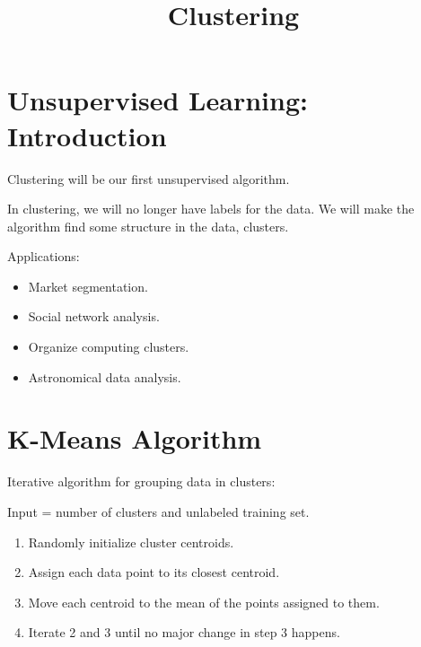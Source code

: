 \documentclass[10pt]{extarticle}
\begin{document}
 



\title{Clustering}

    
    \date{}
    

    

    \maketitle

\newpage





\section{Unsupervised Learning:
Introduction}\label{unsupervised-learning-introduction}

Clustering will be our first unsupervised algorithm.

In clustering, we will no longer have labels for the data. We will make
the algorithm find some structure in the data, clusters.

Applications:

\begin{itemize}
\itemsep1pt\parskip0pt
\item
  Market segmentation.
\item
  Social network analysis.
\item
  Organize computing clusters.
\item
  Astronomical data analysis.
\end{itemize}

\section{K-Means Algorithm}\label{k-means-algorithm}

Iterative algorithm for grouping data in clusters:

Input = number of clusters and unlabeled training set.

\begin{enumerate}
\def\labelenumi{\arabic{enumi}.}
\itemsep1pt\parskip0pt
\item
  Randomly initialize cluster centroids.
\item
  Assign each data point to its closest centroid.
\item
  Move each centroid to the mean of the points assigned to them.
\item
  Iterate 2 and 3 until no major change in step 3 happens.
\end{enumerate}
\end{document}
